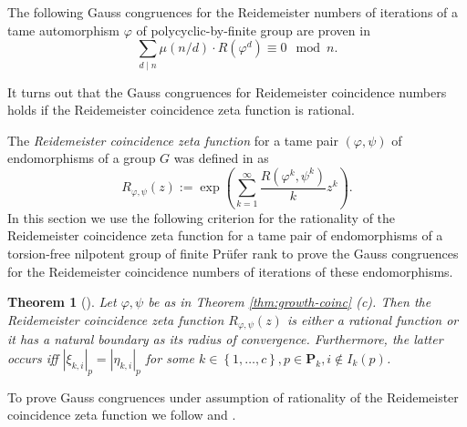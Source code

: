 \documentclass[12pt, a4paper]{amsart}
\newtheorem{theorem}{Theorem}
\begin{document}
The following Gauss congruences  for the  Reidemeister numbers of iterations of a tame automorphism $\varphi$ of polycyclic-by-finite group are proven in \cite{polyc}
$$
\sum_{d\mid n}\mu(n/d)\cdot R(\varphi^{d})\equiv 0\mod n.
$$

It turns out that the Gauss congruences for Reidemeister coincidence numbers holds if
the Reidemeister coincidence zeta function is rational.

The \emph{Reidemeister coincidence zeta function} for a tame pair
$(\varphi, \psi)$ of  endomorphisms  of a group $G$
was defined in \cite{FelsKlop} as
\begin{equation}\label{eq:zeta-def}
  R_{\varphi, \psi}(z) := \exp \left( \sum_{k=1}^{\infty}\frac{R(\varphi^k, \psi^k)}{k} z^k \right).
\end{equation}
In this section we use the following  criterion for the rationality of the Reidemeister coincidence zeta function
for a  tame pair of  endomorphisms  of a  torsion-free nilpotent group of finite Pr\"ufer rank to
prove the Gauss congruences  for the Reidemeister coincidence numbers of iterations of these   endomorphisms.

\begin{theorem}[]\label{thm:reidemeister-rationality-klopsch}
  Let $\varphi, \psi$ be as in \rm{Theorem \ref{thm:growth-coinc} (c)}.
  Then the Reidemeister coincidence zeta function $R_{\varphi, \psi}(z)$ is either a rational function
  or it has a natural boundary as its radius of convergence.
  Furthermore, the latter occurs iff $|\xi_{k,i}|_p = |\eta_{k,i}|_p$ for some $k \in \left\{ 1, \dots, c \right\},
  p \in \mathbf{P}_k, i \notin I_k(p)$.
\end{theorem}

To prove Gauss congruences under assumption of rationality of the Reidemeister coincidence zeta function
we follow \cite[Theorem~2.1]{BaBo} and \cite[Theorem 3.1.23, Proposition~3.1.12]{JezMar}.
\end{document}

